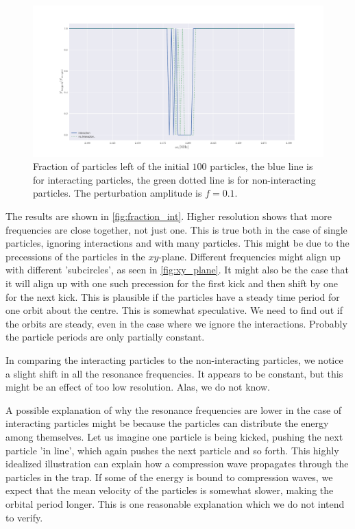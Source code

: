 \begin{figure}
\centering
\includegraphics[width=1.\linewidth]{../figures/fraction_left_interaction.pdf}
\caption{Fraction of particles left of the initial $100$ particles, the blue line is for interacting particles, 
the green dotted line is for non-interacting particles. The perturbation amplitude is $f = 0.1$. }
\label{fig:fraction_int}
\end{figure}

The results are shown in \autoref{fig:fraction_int}.
Higher resolution shows that more frequencies are close together, not just one. This is
true both in the case of single particles, ignoring interactions and with many particles.
This might be due to the precessions of the particles in the $xy$-plane. Different frequencies might align
up with different 'subcircles', as seen in \autoref{fig:xy_plane}. It might also be the case that it will align
up with one such precession for the first kick and then shift by one for the next kick. This is plausible if the
particles have a steady time period for one orbit about the centre.
This is somewhat speculative. We need to find out if the orbits are steady, even in the case where we ignore
the interactions. Probably the particle periods are only partially constant.

In comparing the interacting particles to the non-interacting particles, we notice a slight
shift in all the resonance frequencies. It appears to be constant, but this might be
an effect of too low resolution. Alas, we do not know.

A possible explanation of why the resonance frequencies are lower in the
case of interacting particles might be because the particles can distribute the energy among
themselves. Let us imagine one particle is being kicked, pushing the next particle 'in line', which again
pushes the next particle and so forth. This highly idealized illustration can explain how a
compression wave propagates through the particles in the trap. If some of the energy is bound to
compression waves, we expect that the mean velocity of the particles is somewhat slower, making the
orbital period longer. This is one reasonable explanation which we do not intend to verify.
